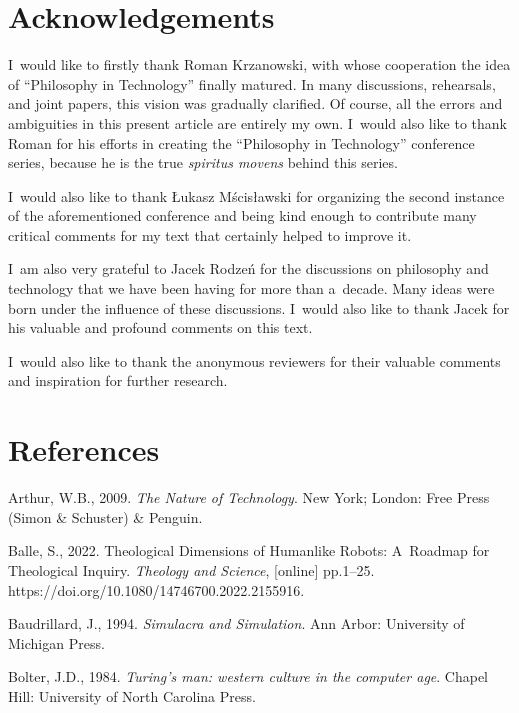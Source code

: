 \section{Acknowledgements}

I~would like to firstly thank Roman Krzanowski, with whose cooperation the idea of ``Philosophy in Technology'' finally matured. In many discussions, rehearsals, and joint papers, this vision was gradually clarified. Of course, all the errors and ambiguities in this present article are entirely my own. I~would also like to thank Roman for his efforts in creating the ``Philosophy in Technology'' conference series, because he is the true \textit{spiritus movens} behind this series.



I~would also like to thank Łukasz Mścisławski for organizing the second instance of the aforementioned conference and being kind enough to contribute many critical comments for my text that certainly helped to improve it.



I~am also very grateful to Jacek Rodzeń for the discussions on philosophy and technology that we have been having for more than a~decade. Many ideas were born under the influence of these discussions. I~would also like to thank Jacek for his valuable and profound comments on this text.



I~would also like to thank the anonymous reviewers for their valuable comments and inspiration for further research.



\section{References}

Arthur, W.B., 2009. \textit{The Nature of Technology}. New York; London: Free Press (Simon \& Schuster) \& Penguin.



Balle, S., 2022. Theological Dimensions of Humanlike Robots: A~Roadmap for Theological Inquiry. \textit{Theology and Science}, [online] pp.1–25. https://doi.org/10.1080/14746700.2022.2155916.



Baudrillard, J., 1994. \textit{Simulacra and Simulation}. Ann Arbor: University of Michigan Press.



Bolter, J.D., 1984. \textit{Turing's man: western culture in the computer age}. Chapel Hill: University of North Carolina Press.



